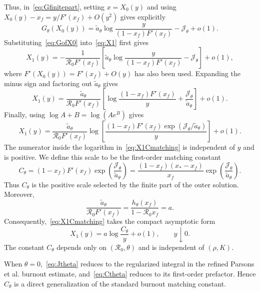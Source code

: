 \documentclass[11pt,a4paper]{article}
\newcommand{\Rzero}{\mathcal R_0}
\newcommand{\Jfun}{\mathcal J_\theta}
\newcommand{\Cfun}{C_\theta}
\newcommand{\xf}{x_f}
\newcommand{\xs}{x_*}
\begin{document}
Thus, in~\eqref{eq:Gfinitepart}, setting $x=X_0(y)$ and using
$X_0(y)-\xf=y/F'(\xf)+O(y^2)$ gives explicitly
\begin{equation}
\label{eq:GofX0}
G_\theta(X_0(y))
=\widetilde a_\theta
\log\frac{y}{(1-\xf)F'(\xf)}
-\Jfun+o(1).
\end{equation}
Substituting~\eqref{eq:GofX0} into~\eqref{eq:X1} first gives
\[
X_1(y)
=-\frac{1}{\Rzero F'(\xf)}
\left[
\widetilde a_\theta
\log\frac{y}{(1-\xf)F'(\xf)}-\Jfun
\right]+o(1),
\]
where $F'(X_0(y))=F'(\xf)+O(y)$ has also been used. Expanding the minus sign
and factoring out $\widetilde a_\theta$ gives
\[
X_1(y)
=\frac{\widetilde a_\theta}{\Rzero F'(\xf)}
\left[
\log\frac{(1-\xf)F'(\xf)}{y}
+\frac{\Jfun}{\widetilde a_\theta}
\right]+o(1).
\]
Finally, using $\log A+B=\log(Ae^B)$ gives
\begin{equation}
\label{eq:X1Cmatching}
X_1(y)
=\frac{\widetilde a_\theta}{\Rzero F'(\xf)}
\log\!\left[
\frac{(1-\xf)F'(\xf)
\exp(\Jfun/\widetilde a_\theta)}{y}
\right]+o(1).
\end{equation}
The numerator inside the logarithm in~\eqref{eq:X1Cmatching} is independent
of $y$ and is positive. We define this scale to be the first-order matching
constant
\begin{equation}
\label{eq:Ctheta}
\Cfun
= (1-\xf)F'(\xf)
\exp\!\left(\frac{\Jfun}{\widetilde a_\theta}\right)
=\frac{(1-\xf)(\xs-\xf)}{\xf}
\exp\!\left(\frac{\Jfun}{\widetilde a_\theta}\right).
\end{equation}
Thus $C_\theta$ is the positive scale selected by the finite part of the outer
solution. Moreover,
\[
\frac{\widetilde a_\theta}{\Rzero F'(\xf)}
=\frac{h_\theta(\xf)}{1-\Rzero\xf}=a.
\]
Consequently,~\eqref{eq:X1Cmatching} takes the compact asymptotic form
\begin{equation}
\label{eq:X1compact}
X_1(y)=a\log\frac{C_\theta}{y}+o(1),
\qquad y\downarrow0.
\end{equation}
The constant $C_\theta$ depends only on $(\Rzero,\theta)$ and is independent of $(\rho,K)$.

When $\theta=0$,~\eqref{eq:Jtheta} reduces to the regularized integral in the refined Parsons et al. burnout estimate, and~\eqref{eq:Ctheta} reduces to its first-order prefactor\cite{PNAS2024}. Hence $C_\theta$ is a direct generalization of the standard burnout matching constant.
\end{document}
